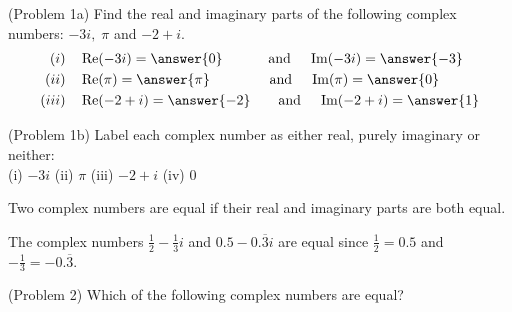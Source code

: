 \documentclass[handout]{ximera}
\begin{document}
\begin{problem}(Problem 1a)
Find the real and imaginary parts of the following complex numbers: $-3i,\; \pi$ and $-2+i$.
\begin{align*}
(i) \quad&\Rep(-3i) = \answer{0} \qquad \quad \; \mbox{and} \quad \; \Imp(-3i) = \answer{-3}\\
(ii) \quad&\Rep(\pi) = \answer{\pi} \qquad \qquad \; \mbox{and} \quad \;\Imp(\pi) = \answer{0}\\
(iii) \quad&\Rep(-2+i) = \answer{-2} \qquad \mbox{and} \quad \; \Imp(-2+i) = \answer{1}\\
\end{align*}

\end{problem}



\begin{problem}(Problem 1b)
Label each complex number as either real, purely imaginary or neither:\\
(i) \quad $-3i$  \quad
(ii) \quad $\pi$   \quad
(iii) \quad $-2+i$   \quad
(iv) \quad $0$  						
\end{problem}

Two complex numbers are equal if their real and imaginary parts are both equal. 



\begin{example}[Example 2]
The complex numbers $\frac12 - \frac13 i$ and $0.5 - 0.{\overline 3}i$ are equal since
$\frac12 = 0.5$ and $-\frac13 = -0.{\overline 3}$.
\end{example}

\begin{problem}(Problem 2)
Which of the following complex numbers are equal?

\begin{selectAll}
\end{selectAll}

\end{problem}
\end{document}
